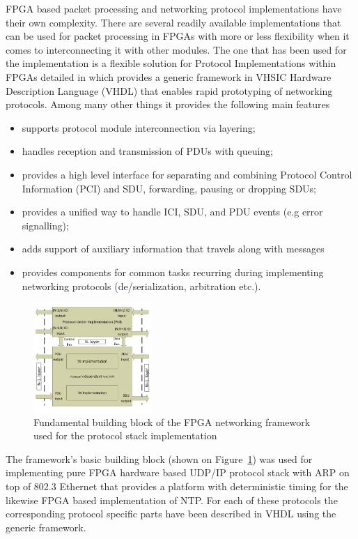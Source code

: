 \documentclass[article]{IEEEtran}
\begin{document}
FPGA based packet processing and networking protocol implementations have their own complexity. There are several
readily available implementations that can be used for packet processing in FPGAs with more or less flexibility when it
comes to interconnecting it
with other modules. The one that has been used for the implementation is a flexible solution for  Protocol
Implementations within FPGAs detailed in \cite{ProtoImpl} which provides a generic framework in VHSIC Hardware
Description Language (VHDL) that enables rapid prototyping of networking protocols. Among many other things it provides
the following main features
\begin{itemize}
    \renewcommand \labelitemi{--}
    \item supports protocol module interconnection via layering;
    \item handles reception and transmission of PDUs with queuing;
    \item provides a high level interface for separating and combining	Protocol Control Information (PCI) and SDU,
          forwarding, pausing or dropping SDUs;
    \item provides a unified way to handle ICI, SDU, and PDU events (e.g error signalling);
    \item adds support of auxiliary information that travels along with messages
    \item provides components for common tasks recurring during implementing networking protocols
          (de/serialization, arbitration etc.).
\end{itemize}

\begin{figure}[!htb]
    \centering
    \includegraphics[width=0.4\textwidth]{figures_raw/system_sketch.pdf}
    \caption{Fundamental building block of the FPGA networking framework used for the protocol stack implementation}
    \label{fig:system_sketch}
\end{figure}

The framework's basic building block (shown on Figure~\ref{fig:system_sketch}) was used for implementing pure FPGA
hardware based
UDP/IP protocol stack with ARP on top of 802.3 Ethernet that provides a platform with deterministic timing for the
likewise FPGA based
implementation of NTP. For each of these protocols the corresponding protocol specific parts have been described in
VHDL using the generic framework.
\end{document}

